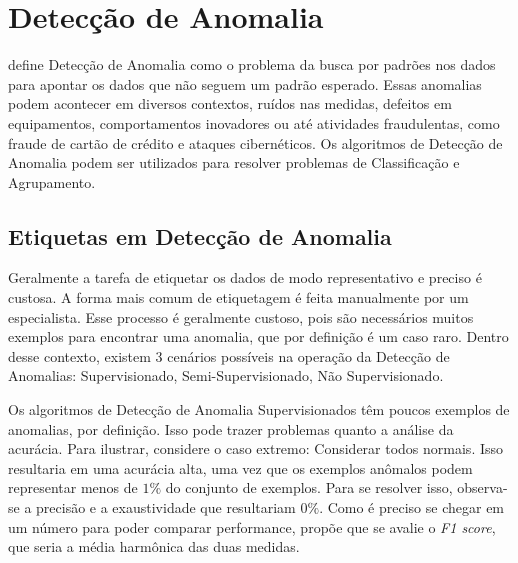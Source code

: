 

\section{Detecção de Anomalia}

\citet{chandola2009anomaly} define Detecção de Anomalia como o problema da busca por padrões nos dados para apontar os dados que não seguem um padrão esperado. Essas anomalias podem acontecer em diversos contextos, ruídos nas medidas, defeitos em equipamentos, comportamentos inovadores ou até atividades fraudulentas, como fraude de cartão de crédito e ataques cibernéticos. Os algoritmos de Detecção de Anomalia podem ser utilizados para resolver problemas de Classificação e Agrupamento.

\subsection{Etiquetas em Detecção de Anomalia}

Geralmente a tarefa de etiquetar os dados de modo representativo e preciso é custosa. A forma mais comum de etiquetagem é feita manualmente por um especialista. Esse processo é geralmente custoso, pois são necessários muitos exemplos para encontrar uma anomalia, que por definição é um caso raro. Dentro desse contexto, existem 3 cenários possíveis na operação da Detecção de Anomalias: Supervisionado, Semi-Supervisionado, Não Supervisionado.

Os algoritmos de Detecção de Anomalia Supervisionados têm poucos exemplos de anomalias, por definição. Isso pode trazer problemas quanto a análise da acurácia. Para ilustrar, considere o caso extremo: Considerar todos normais. Isso resultaria em uma acurácia alta, uma vez que os exemplos anômalos podem representar menos de \(1\%\) do conjunto de exemplos. Para se resolver isso, observa-se a precisão e a exaustividade que resultariam \(0\%\). Como é preciso se chegar em um número para poder comparar performance, \citet{witten2011data} propõe que se avalie o \textit{F1 score}, que seria a média harmônica das duas medidas.

